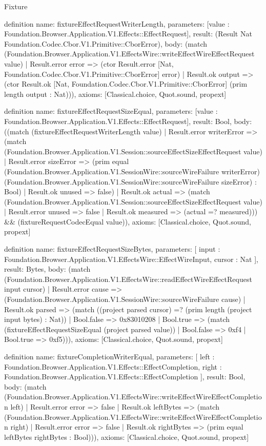 \begin{lexlean}{Fixture}
\begin{semanticmodule}
definition{
  name: fixtureEffectRequestWriterLength,
  parameters: [value : Foundation.Browser.Application.V1.Effects::EffectRequest],
  result: (Result Nat Foundation.Codec.Cbor.V1.Primitive::CborError),
  body: (match (Foundation.Browser.Application.V1.EffectsWire::writeEffectWireEffectRequest value)
    | Result.error error => (ctor Result.error [Nat, Foundation.Codec.Cbor.V1.Primitive::CborError] error)
    | Result.ok output => (ctor Result.ok [Nat, Foundation.Codec.Cbor.V1.Primitive::CborError] (prim length output : Nat))),
  axioms: [Classical.choice, Quot.sound, propext]
}

definition{
  name: fixtureEffectRequestSizeEqual,
  parameters: [value : Foundation.Browser.Application.V1.Effects::EffectRequest],
  result: Bool,
  body: ((match (fixtureEffectRequestWriterLength value)
    | Result.error writerError => (match (Foundation.Browser.Application.V1.Session::sourceEffectSizeEffectRequest value)
      | Result.error sizeError => (prim equal (Foundation.Browser.Application.V1.SessionWire::sourceWireFailure writerError) (Foundation.Browser.Application.V1.SessionWire::sourceWireFailure sizeError) : Bool)
      | Result.ok unused => false)
    | Result.ok actual => (match (Foundation.Browser.Application.V1.Session::sourceEffectSizeEffectRequest value)
      | Result.error unused => false
      | Result.ok measured => (actual =? measured))) && (fixtureRequestCodecEqual value)),
  axioms: [Classical.choice, Quot.sound, propext]
}

definition{
  name: fixtureEffectRequestSizeBytes,
  parameters: [
    input : Foundation.Browser.Application.V1.EffectsWire::EffectWireInput,
    cursor : Nat
  ],
  result: Bytes,
  body: (match (Foundation.Browser.Application.V1.EffectsWire::readEffectWireEffectRequest input cursor)
    | Result.error cause => (Foundation.Browser.Application.V1.SessionWire::sourceWireFailure cause)
    | Result.ok parsed => (match ((project parsed cursor) =? (prim length (project input bytes) : Nat))
      | Bool.false => 0x83010208
      | Bool.true => (match (fixtureEffectRequestSizeEqual (project parsed value))
        | Bool.false => 0xf4
        | Bool.true => 0xf5))),
  axioms: [Classical.choice, Quot.sound, propext]
}

definition{
  name: fixtureCompletionWriterEqual,
  parameters: [
    left : Foundation.Browser.Application.V1.Effects::EffectCompletion,
    right : Foundation.Browser.Application.V1.Effects::EffectCompletion
  ],
  result: Bool,
  body: (match (Foundation.Browser.Application.V1.EffectsWire::writeEffectWireEffectCompletion left)
    | Result.error error => false
    | Result.ok leftBytes => (match (Foundation.Browser.Application.V1.EffectsWire::writeEffectWireEffectCompletion right)
      | Result.error error => false
      | Result.ok rightBytes => (prim equal leftBytes rightBytes : Bool))),
  axioms: [Classical.choice, Quot.sound, propext]
}


\end{semanticmodule}
\end{lexlean}
